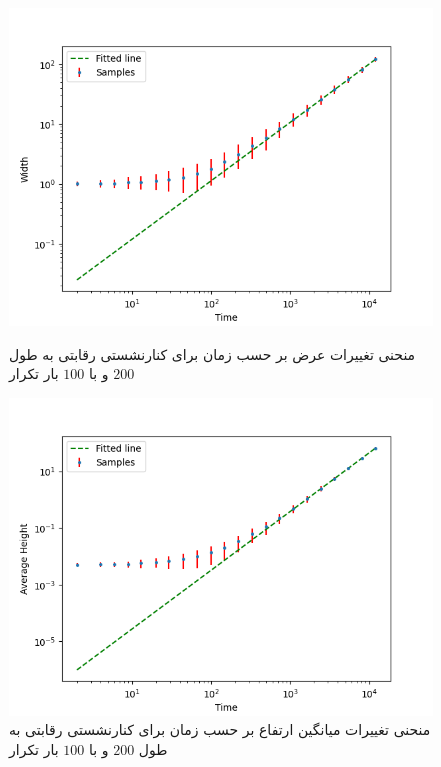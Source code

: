 \documentclass[11pt, a4paper]{article}
\begin{document}
\begin{figure}[h]
	\centering
  \begin{minipage}[b]{0.48\textwidth}
    \includegraphics[width=\textwidth]{q7_200_100_1_9.5_.4_width.png}
    \caption{منحنی تغییرات عرض بر حسب زمان برای کنارنشستی رقابتی به طول $200$ و با $100$ بار تکرار}
    \label{fig:q7_200_100_width}
  \end{minipage}
  \hfill
  \begin{minipage}[b]{0.48\textwidth}
    \includegraphics[width=\textwidth]{q7_200_100_1_9.5_.4_avg.png}
    \caption{منحنی تغییرات میانگین ارتفاع بر حسب زمان برای کنارنشستی رقابتی به طول $200$ و با $100$ بار تکرار}
    \label{fig:q7_200_100_avg}
  \end{minipage}

\end{figure}
\end{document}
